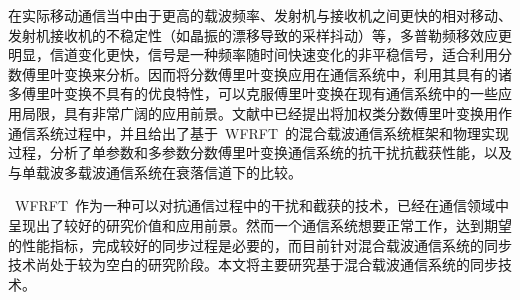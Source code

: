 在实际移动通信当中由于更高的载波频率、发射机与接收机之间更快的相对移动、发射机接收机的不稳定性（如晶振的漂移导致的采样抖动）等，多普勒频移效应更明显，信道变化更快，信号是一种频率随时间快速变化的非平稳信号，适合利用分数傅里叶变换来分析。因而将分数傅里叶变换应用在通信系统中，利用其具有的诸多傅里叶变换不具有的优良特性，可以克服傅里叶变换在现有通信系统中的一些应用局限，具有非常广阔的应用前景。文献中\cite{mei2017_38_44}已经提出将加权类分数傅里叶变换用作通信系统过程中，并且给出了基于~WFRFT~的混合载波通信系统框架和物理实现过程，分析了单参数和多参数分数傅里叶变换通信系统的抗干扰抗截获性能，以及与单载波多载波通信系统在衰落信道下的比较。

~WFRFT~作为一种可以对抗通信过程中的干扰和截获的技术，已经在通信领域中呈现出了较好的研究价值和应用前景。然而一个通信系统想要正常工作，达到期望的性能指标，完成较好的同步过程是必要的，而目前针对混合载波通信系统的同步技术尚处于较为空白的研究阶段。本文将主要研究基于混合载波通信系统的同步技术。

